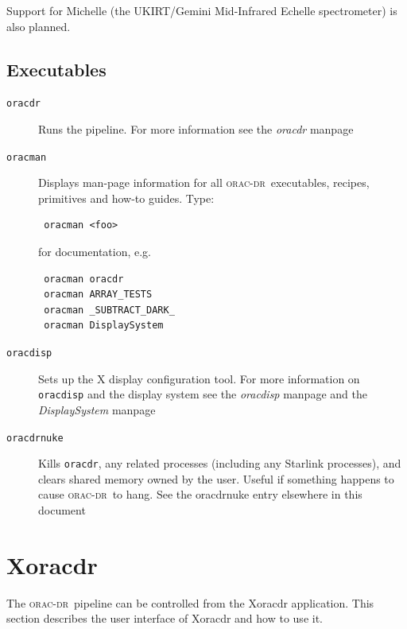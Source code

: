 \documentclass[twoside,11pt]{article}
\renewcommand{\_}{\texttt{\symbol{95}}}
\newcommand{\oracdr}{\textsc{orac-dr}}
\begin{document}
Support for Michelle (the UKIRT/Gemini Mid-Infrared Echelle
spectrometer) is also planned.

\subsection*{Executables\label{ORAC-DR_Components_Executables}}\begin{description}
\item[\texttt{oracdr}] \mbox{}

Runs the pipeline. For more information see the \emph{oracdr} manpage

\item[\texttt{oracman}] \mbox{}

Displays man-page information for all \oracdr\ executables, recipes,
primitives and how-to guides. Type:

\begin{verbatim}
 oracman <foo>
\end{verbatim}


for documentation, e.g.

\begin{verbatim}
 oracman oracdr
 oracman ARRAY_TESTS
 oracman _SUBTRACT_DARK_
 oracman DisplaySystem
\end{verbatim}
\item[\texttt{oracdisp}] \mbox{}

Sets up the X display configuration tool. For more information on
\texttt{oracdisp} and the display system see the \emph{oracdisp} manpage and the \emph{DisplaySystem} manpage

\item[\texttt{oracdr\_nuke}] \mbox{}

Kills \texttt{oracdr}, any related processes (including any Starlink
processes), and clears shared memory owned by the user. Useful if
something happens to cause \oracdr\ to hang. See the \textsf{oracdr\_nuke}
 entry elsewhere in this document

\end{description}

\section{Xoracdr\label{Xoracdr}}

The \oracdr\ pipeline can be controlled from the Xoracdr
application. This section describes the user interface of Xoracdr and how
to use it.
\end{document}
